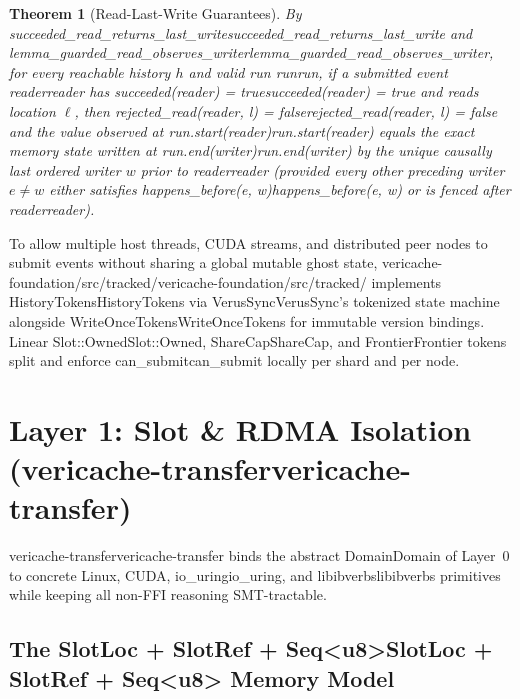 \documentclass[11pt,a4paper]{article}
\newtheorem{theorem}[definition]{Theorem}
\let\origunderscore\_
\DeclareRobustCommand{\code}[1]{{\ttfamily\ifmmode #1\else\def\_{\origunderscore\hspace{0pt}}#1\fi}}
\begin{document}
\begin{theorem}[Read-Last-Write Guarantees]
By \code{succeeded\_read\_returns\_last\_write} and \code{lemma\_guarded\_read\_observes\_writer}, for every reachable history $h$ and valid run \code{run}, if a submitted event \code{reader} has \code{succeeded(reader) = true} and reads location $\ell$, then \code{rejected\_read(reader, l) = false} and the value observed at \code{run.start(reader)} equals the exact memory state written at \code{run.end(writer)} by the unique causally last ordered writer $w$ prior to \code{reader} (provided every other preceding writer $e \neq w$ either satisfies \code{happens\_before(e, w)} or is fenced after \code{reader}).
\end{theorem}

To allow multiple host threads, CUDA streams, and distributed peer nodes to submit events without sharing a global mutable ghost state, \code{vericache-foundation/src/tracked/} implements \code{HistoryTokens} via \code{VerusSync}'s tokenized state machine~\cite{verussync} alongside \code{WriteOnceTokens} for immutable version bindings. Linear \code{Slot::Owned}, \code{ShareCap}, and \code{Frontier} tokens split and enforce \code{can\_submit} locally per shard and per node.

\section{Layer 1: Slot \& RDMA Isolation (\code{vericache-transfer})}
\label{sec:transfer}

\code{vericache-transfer} binds the abstract \code{Domain} of Layer~0 to concrete Linux, CUDA, \code{io\_uring}, and \code{libibverbs} primitives while keeping all non-FFI reasoning SMT-tractable.

\subsection{The \code{SlotLoc + SlotRef + Seq<u8>} Memory Model}
\end{document}
